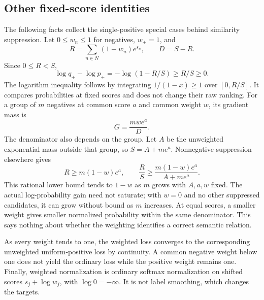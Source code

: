 \subsection{Other fixed-score identities}
The following facts collect the single-positive special cases behind similarity suppression. Let $0\leq w_n\leq1$ for negatives, $w_+=1$, and
\begin{equation}
R=\sum_{n\in N}(1-w_n)e^{s_n},\qquad D=S-R.
\end{equation}
Since $0\leq R<S$,
\begin{equation}
\log q_+-\log p_+=-\log(1-R/S)\geq R/S\geq0.
\end{equation}
The logarithm inequality follows by integrating $1/(1-x)\geq1$ over $[0,R/S]$. It compares probabilities at fixed scores and does not change their raw ranking. For a group of $m$ negatives at common score $a$ and common weight $w$, its gradient mass is
\begin{equation}
G=\frac{mw e^a}{D}.
\end{equation}
The denominator also depends on the group. Let $A$ be the unweighted exponential mass outside that group, so $S=A+me^a$. Nonnegative suppression elsewhere gives
\begin{equation}
R\geq m(1-w)e^a,\qquad
\frac{R}{S}\geq\frac{m(1-w)e^a}{A+me^a}.
\end{equation}
This rational lower bound tends to $1-w$ as $m$ grows with $A,a,w$ fixed. The actual log-probability gain need not saturate; with $w=0$ and no other suppressed candidates, it can grow without bound as $m$ increases. At equal scores, a smaller weight gives smaller normalized probability within the same denominator. This says nothing about whether the weighting identifies a correct semantic relation.

As every weight tends to one, the weighted loss converges to the corresponding unweighted uniform-positive loss by continuity. A common negative weight below one does not yield the ordinary loss while the positive weight remains one. Finally, weighted normalization is ordinary softmax normalization on shifted scores $s_j+\log w_j$, with $\log0=-\infty$. It is not label smoothing, which changes the targets.
